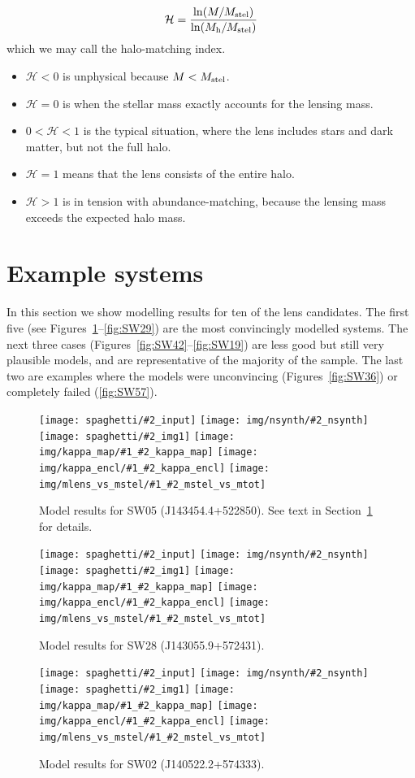 \documentclass[fleqn,usenatbib]{mnras}
\newcommand{\inclfign}[2]{
  \centering
	\texttt{[image: spaghetti/\#2\_input]}%
	\texttt{[image: img/nsynth/\#2\_nsynth]}
	\texttt{[image: spaghetti/\#2\_img1]}%
        \texttt{[image: img/kappa\_map/\#1\_\#2\_kappa\_map]}
	\texttt{[image: img/kappa\_encl/\#1\_\#2\_kappa\_encl]}%
	\texttt{[image: img/mlens\_vs\_mstel/\#1\_\#2\_mstel\_vs\_mtot]}
}
\newcommand{\figref}[1]{\ref{fig:#1}}
\newcommand{\Mstel}{M_{\rm stel}}
\newcommand{\Mhalo}{M_{\rm h}}
\newcommand{\haloindex}{\mathcal{H}}
\begin{document}
\begin{equation}
\haloindex = \frac{\ln(M/\Mstel)}{\ln(\Mhalo/\Mstel)}
\end{equation}
which we may call the halo-matching index.
\begin{itemize}
\item $\haloindex < 0$ is unphysical because $M<\Mstel$.
\item $\haloindex = 0$ is when the stellar mass exactly accounts for the
  lensing mass.
\item $0 < \haloindex < 1$ is the typical situation, where the lens
  includes stars and dark matter, but not the full halo.
\item $\haloindex = 1$ means that the lens consists of the entire halo.
\item $\haloindex > 1$ is in tension with abundance-matching, because the
  lensing mass exceeds the expected halo mass.
\end{itemize}


\section{Example systems}\label{sec:examples}

In this section we show modelling results for ten of the lens
candidates.  The first five (see Figures~\figref{SW05}--\figref{SW29})
are the most convincingly modelled systems.  The next three cases
(Figures~\figref{SW42}--\figref{SW19}) are less good but still very
plausible models, and are representative of the majority of the
sample.  The last two are examples where the models were unconvincing
(Figures~\figref{SW36}) or completely failed (\figref{SW57}).

\begin{figure}
  \inclfign{SW05}{ASW0007k4r_N7LTELSYTM}
  \caption{Model results for SW05 (J143454.4+522850).  See text in
    Section~\ref{sec:examples} for details.}
  \label{fig:SW05}
\end{figure}

\begin{figure}
  \inclfign{SW28}{ASW0007xrs_JHC3J2HYV7}
  \caption{Model results for SW28 (J143055.9+572431).}
  \label{fig:SW28}
\end{figure}

\begin{figure}
  \inclfign{SW02}{ASW000619d_011489}
  \caption{Model results for SW02 (J140522.2+574333).}
  \label{fig:SW02}
\end{figure}
\end{document}

